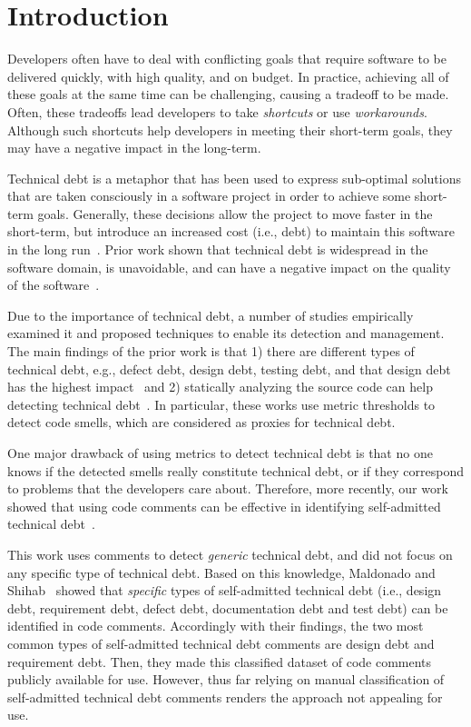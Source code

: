 \documentclass{sig-alternate}
\newcommand{\SATD}{self-admitted technical debt\xspace}
\begin{document}
\terms{}

\keywords{}

\section{Introduction}
\label{sec:introduction}
Developers often have to deal with conflicting goals that require software to be delivered quickly, with high quality, and on budget. In practice, achieving all of these goals at the same time can be challenging, causing a tradeoff to be made. Often, these tradeoffs lead developers to take \emph{shortcuts} or use \emph{workarounds}. Although such shortcuts help developers in meeting their short-term goals, they may have a negative impact in the long-term.

Technical debt is a metaphor that has been used to express sub-optimal solutions that are taken consciously in a software project in order to achieve some short-term goals. Generally, these decisions allow the project to move faster in the short-term, but introduce an increased cost (i.e., debt) to maintain this software in the long run~\cite{Seaman2011,Kruchten2013IWMTD}. Prior work shown that technical debt is widespread in the software domain, is unavoidable, and can have a negative impact on the quality of the software~\cite{Lim2012Software}.

Due to the importance of technical debt, a number of studies empirically examined it and proposed techniques to enable its detection and management. The main findings of the prior work is that 1) there are different types of technical debt, e.g., defect debt, design debt, testing debt, and that design debt has the highest impact~\cite{Alves2014MTD,Marinescu2012IBM} and 2) statically analyzing the source code can help detecting technical debt~\cite{Marinescu2004ICSM,Marinescu2010CSMR,Zazworka2013CSE}. In particular, these works use metric thresholds to detect code smells, which are considered as proxies for technical debt. 

One major drawback of using metrics to detect technical debt is that no one knows if the detected smells really constitute technical debt, or if they correspond to problems that the developers care about. Therefore, more recently, our work showed that using code comments can be effective in identifying self-admitted technical debt~\cite{Potdar2014ICSME}. 

This work uses comments to detect \emph{generic} technical debt, and did not focus on any specific type of technical debt. Based on this knowledge, Maldonado and Shihab~\cite{Maldonado2015MTD} showed that \emph{specific} types of self-admitted technical debt (i.e., design debt, requirement debt, defect debt, documentation debt and test debt) can be identified in code comments. Accordingly with their findings, the two most common types of \SATD comments are design debt and requirement debt. Then, they made this classified dataset of code comments publicly available for use. However, thus far relying on manual classification of \SATD comments renders the approach not appealing for use.
\end{document}
